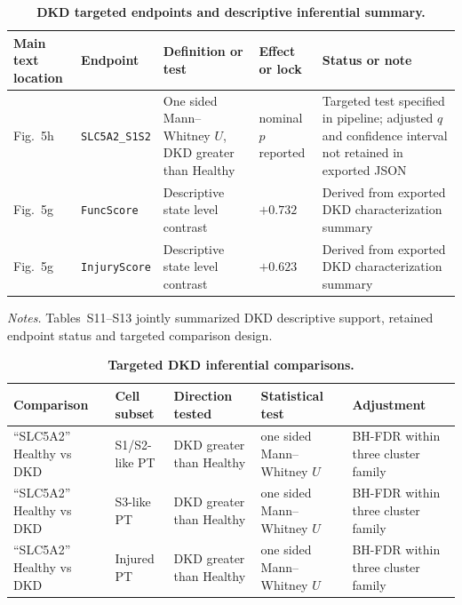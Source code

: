 \documentclass[11pt]{article}
\begin{document}
\FloatBarrier

\begin{table}[htbp]
\centering
\caption{\textbf{DKD targeted endpoints and descriptive inferential summary.}}
\label{tab:s12_dkd_targeted_registry}
\scriptsize
\begin{tabularx}{\textwidth}{@{}L{0.12\textwidth} L{0.25\textwidth} Y L{0.12\textwidth} L{0.20\textwidth}@{}}
\toprule
\textbf{Main text location} & \textbf{Endpoint} & \textbf{Definition or test} & \textbf{Effect or lock} & \textbf{Status or note} \\
\midrule
Fig.~5h & \texttt{SLC5A2\_S1S2} & One sided Mann--Whitney \(U\), DKD greater than Healthy & nominal \(p\) reported & Targeted test specified in pipeline; adjusted \(q\) and confidence interval not retained in exported JSON \\
Fig.~5g & \texttt{FuncScore} & Descriptive state level contrast & \(+0.732\) & Derived from exported DKD characterization summary \\
Fig.~5g & \texttt{InjuryScore} & Descriptive state level contrast & \(+0.623\) & Derived from exported DKD characterization summary \\
\bottomrule
\end{tabularx}

\vspace{0.5em}
{\raggedright\scriptsize\textit{Notes.} Tables~S11--S13 jointly summarized DKD descriptive support, retained endpoint status and targeted comparison design.\par}
\end{table}

\FloatBarrier

\begin{table}[htbp]
\centering
\caption{\textbf{Targeted DKD inferential comparisons.}}
\label{tab:s13_dkd_stats}
\scriptsize
\begin{tabularx}{\textwidth}{@{}L{0.20\textwidth} L{0.20\textwidth} L{0.15\textwidth} L{0.20\textwidth} Y@{}}
\toprule
\textbf{Comparison} & \textbf{Cell subset} & \textbf{Direction tested} & \textbf{Statistical test} & \textbf{Adjustment} \\
\midrule
``SLC5A2'' Healthy vs DKD & S1/S2-like PT & DKD greater than Healthy & one sided Mann--Whitney \(U\) & BH-FDR within three cluster family \\
``SLC5A2'' Healthy vs DKD & S3-like PT & DKD greater than Healthy & one sided Mann--Whitney \(U\) & BH-FDR within three cluster family \\
``SLC5A2'' Healthy vs DKD & Injured PT & DKD greater than Healthy & one sided Mann--Whitney \(U\) & BH-FDR within three cluster family \\
\bottomrule
\end{tabularx}
\end{table}
\end{document}
